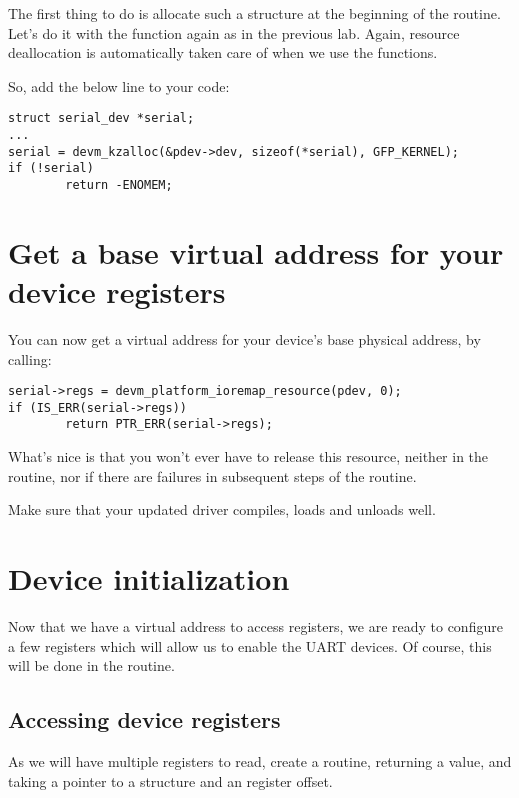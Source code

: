 The first thing to do is allocate such a structure at the beginning
of the  routine. Let's do it with the 
function again as in the previous lab. Again, resource deallocation is
automatically taken care of when we use the  functions.

So, add the below line to your code:

\begin{verbatim}
struct serial_dev *serial;
...
serial = devm_kzalloc(&pdev->dev, sizeof(*serial), GFP_KERNEL);
if (!serial)
        return -ENOMEM;
\end{verbatim}

\section{Get a base virtual address for your device registers}

You can now get a virtual address for your device's base physical
address, by calling:

\begin{verbatim}
serial->regs = devm_platform_ioremap_resource(pdev, 0);
if (IS_ERR(serial->regs))
        return PTR_ERR(serial->regs);
\end{verbatim}

What's nice is that you won't ever have to release this resource,
neither in the  routine, nor if there are failures
in subsequent steps of the  routine.

Make sure that your updated driver compiles, loads and unloads well.

\section{Device initialization}

Now that we have a virtual address to access registers, we are ready to
configure a few registers which will allow us to enable the UART
devices. Of course, this will be done in the  routine.

\subsection{Accessing device registers}

As we will have multiple registers to read, create a 
routine, returning a  value, and taking a 
pointer to a  structure and an 
register offset.

